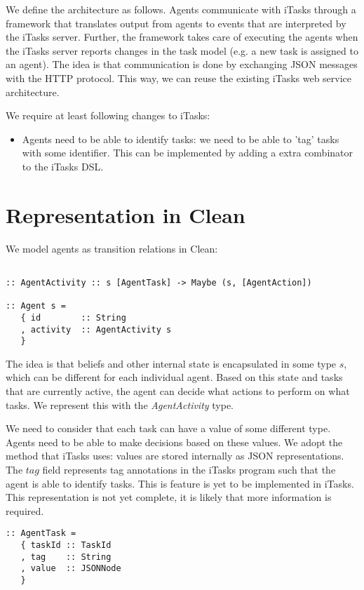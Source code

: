 \documentclass[english]{article}
\begin{document}
We define the architecture as follows. Agents communicate with iTasks through a framework that translates output from agents to events that are interpreted by the iTasks server. Further, the framework takes care of executing the agents when the iTasks server reports changes in the task model (e.g. a new task is assigned to an agent). The idea is that communication is done by exchanging JSON messages with the HTTP protocol. This way, we can reuse the existing iTasks web service architecture.

We require at least following changes to iTasks:

\begin{itemize}
\item Agents need to be able to identify tasks: we need to be able to 'tag' tasks with some identifier. This can be implemented by adding a extra combinator to the iTasks DSL. 
\end{itemize}

\section{Representation in Clean}

We model agents as transition relations in Clean: 

\begin{lstlisting}

:: AgentActivity :: s [AgentTask] -> Maybe (s, [AgentAction])

:: Agent s = 
   { id        :: String
   , activity  :: AgentActivity s
   }
\end{lstlisting}

The idea is that beliefs and other internal state is encapsulated in some type $s$, which can be different for each individual agent. Based on this state and tasks that are currently active, the agent can decide what actions to perform on what tasks. We represent this with the \textit{AgentActivity} type.

We need to consider that each task can have a value of some different type. Agents need to be able to make decisions based on these values. We adopt the method that iTasks uses: values are stored internally as JSON representations. The $tag$ field represents tag annotations in the iTasks program such that the agent is able to identify tasks. This is feature is yet to be implemented in iTasks. This representation is not yet complete, it is likely that more information is required.

\begin{lstlisting}
:: AgentTask = 
   { taskId :: TaskId
   , tag    :: String
   , value  :: JSONNode
   }
\end{lstlisting}
\end{document}
